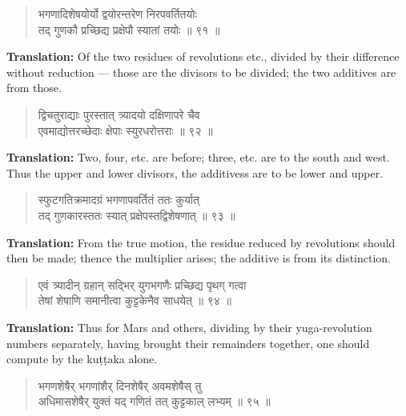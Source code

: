 \documentclass[11pt,a4paper]{article}
\newenvironment{shloka}{\begin{verse}\devanagarifont\large}{\end{verse}}
\begin{document}
\begin{shloka}
भगणादिशेषयोर्यो द्वयोरन्तरेण निरपवर्तितयोः \\
तद् गुणकौ प्रच्छिद्य प्रक्षेपौ स्यातां तयोः ॥ ९१ ॥
\end{shloka}

\textbf{Translation:}\quad
Of the two residues of revolutions etc., divided by their difference
without reduction — those are the divisors to be divided; the two
additives are from those.

\vspace{0.3cm}

\begin{shloka}
द्विचतुराद्याः पुरस्तात् त्र्यादयो दक्षिणापरे चैव \\
एवमाद्योत्तरच्छेदाः क्षेपाः स्युरधरोत्तराः ॥ ९२ ॥
\end{shloka}

\textbf{Translation:}\quad
Two, four, etc. are before; three, etc. are to the south and west.
Thus the upper and lower divisors, the additivess are to be lower
and upper.

\vspace{0.3cm}

\begin{shloka}
स्फुटगतिक्रमादग्रं भगणापवर्तितं ततः कुर्यात् \\
तद् गुणकारस्ततः स्यात् प्रक्षेपस्तद्विशेषणात् ॥ ९३ ॥
\end{shloka}

\textbf{Translation:}\quad
From the true motion, the residue reduced by revolutions should then
be made; thence the multiplier arises; the additive is from its
distinction.

\vspace{0.3cm}

\begin{shloka}
एवं त्र्यादीन् ग्रहान् सद्भिर् युगभगणैः प्रच्छिद्य पृथग् गत्वा \\
तेषां शेषाणि समानीत्वा कुट्टकेनैव साधयेत् ॥ ९४ ॥
\end{shloka}

\textbf{Translation:}\quad
Thus for Mars and others, dividing by their yuga-revolution numbers
separately, having brought their remainders together, one should
compute by the kuṭṭaka alone.

\vspace{0.3cm}

\begin{shloka}
भगणशेषैर् भगणांशैर् दिनशेषैर् अवमशेषैस् तु \\
अधिमासशेषैर् युक्तं यद् गणितं तत् कुट्टकाल् लभ्यम् ॥ ९५ ॥
\end{shloka}
\end{document}
